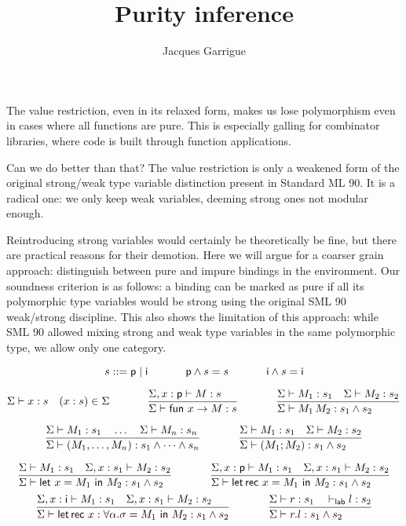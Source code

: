 \documentclass[a4paper]{article}
\title{Purity inference}
\author{Jacques Garrigue}
\let\th\vdash
\let\E\Sigma
\let\ra\rightarrow
\let\tv\alpha
\def\p{\mathsf{p}}
\def\i{\mathsf{i}}
\newcommand\lfrac[2]{\frac{#1\hfill}{#2\hfill}}
\newcommand\mlet[1]{\textsf{let}~#1~\textsf{in}~}
\newcommand\mletrec[1]{\textsf{let\,rec}~#1~\textsf{in}~}
\newcommand\mfun[1]{\textsf{fun}~#1 \ra}
\begin{document}
\maketitle

The value restriction, even in its relaxed form, makes us lose
polymorphism even in cases where all functions are pure.
This is especially galling for combinator libraries, where code is
built through function applications.

Can we do better than that?
The value restriction is only a weakened form of the original
strong/weak type variable distinction present in Standard ML 90.
It is a radical one: we only keep weak variables, deeming strong ones
not modular enough.

Reintroducing strong variables would certainly be theoretically be
fine, but there are practical reasons for their demotion.
Here we will argue for a coarser grain approach: distinguish between
pure and impure bindings in the environment.
Our soundness criterion is as follows: a binding can be marked as pure
if all its polymorphic type variables would be strong using the
original SML 90 weak/strong discipline.
This also shows the limitation of this approach: while SML 90 allowed
mixing strong and weak type variables in the same polymorphic type, we
allow only one category.

\[ s ::= \p \mid \i
\hspace{8ex}
\p \land s = s
\hspace{8ex}
\i \land s = \i
\]

\[
\E \th x : s  \quad (x:s)\in \E
\hspace{8ex}
\lfrac{\E, x : \p \th M : s}
     {\E \th \mfun x M : s}
\hspace{8ex}
\lfrac{\E \th M_1 : s_1 \quad \E \th M_2 : s_2}
{\E \th M_1 \, M_2 : s_1 \land s_2}
\]

\[
\lfrac{\E \th M_1 : s_1 \quad \dots \quad \E \th M_n : s_n}
{\E \th (M_1, \dots, M_n) : s_1 \land \dots \land s_n}
\hspace{8ex}
\lfrac{\E \th M_1 : s_1 \quad \E \th M_2 : s_2}
{\E \th (M_1 ; M_2) : s_1 \land s_2}
\]

\[
\lfrac{\E \th M_1 : s_1 \quad \E, x : s_1 \th M_2 : s_2}
{\E \th \mlet{x=M_1} M_2 : s_1 \land s_2}
\hspace{8ex}
\lfrac{\E, x : \p \th M_1 : s_1 \quad \E, x : s_1 \th M_2 : s_2}
{\E \th \mletrec{x=M_1} M_2 : s_1 \land s_2}
\]
\[
\lfrac{\E, x : \i \th M_1 : s_1 \quad \E, x : s_1 \th M_2 : s_2}
{\E \th \mletrec{x:\forall\tv.\sigma=M_1} M_2 : s_1 \land s_2}
\hspace{8ex}
\lfrac{\E \th r : s_1 \quad \th_{\sf lab} l : s_2}
{\E \th r.l : s_1 \land s_2}
\]
\end{document}
